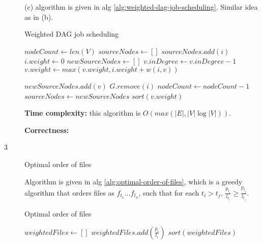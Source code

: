 \documentclass{article}
\begin{document}
\begin{description}
  (c) algorithm is given in alg \ref{alg:weighted-dag-job-scheduling}. Similar idea as in (b). 

  \begin{algorithm}[h]
  \caption{Weighted DAG job scheduling}
  \label{alg:weighted-dag-job-scheduling}
    \begin{algorithmic}[1]
  
      \State $nodeCount \gets len(V)$
      \State $sourceNodes \gets []$
          \State $sourceNodes.add(i)$
          \State $i.weight \gets 0$
        \EndIf
      \EndFor
        \State $newSourceNodes \gets []$
            \State $v.inDegree \gets v.inDegree - 1$
            \State $v.weight \gets max(v.weight, i.weight + w(i,v))$
            
              \State $newSourceNodes.add(v)$
            \EndIf
          \EndFor
          \State $G.remove(i)$
          \State $nodeCount \gets nodeCount - 1$
        \EndFor
        \State $sourceNodes \gets newSourceNodes$
      \EndWhile
      \State \Return $sort(v.weight)$
    \EndFunction
    
    \end{algorithmic}
  \end{algorithm}

  \textbf{Time complexity:} this algorithm is $O(max(|E|, |V| \log |V|))$.

  \textbf{Correctness:} 

\item[3]{Optimal order of files}
  
  Algorithm is given in alg \ref{alg:optimal-order-of-files}, which is a greedy algorithm that orders files as $f_{t_1}...f_{t_n}$, such that for each $t_i > t_j$, $\frac{p_{t_i}}{l_{t_i}} \geq \frac{p_{t_j}}{l_{t_j}}$.

  \begin{algorithm}[h]
  \caption{Optimal order of files}
  \label{alg:optimal-order-of-files}
    \begin{algorithmic}[1]
  
      \State $weightedFiles \gets []$
        \State $weightedFiles.add(\frac{p_i}{l_i})$
      \EndFor
      \State \Return $sort(weightedFiles)$
    \EndFunction
    

\end{algorithmic}
\end{algorithm}
\end{description}
\end{document}
